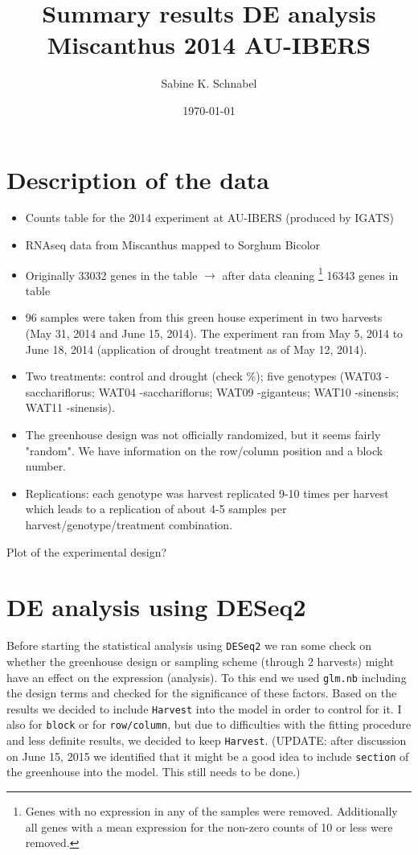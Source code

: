 \documentclass[12pt, a4paper]{article}
\title{Summary results DE analysis Miscanthus 2014 AU-IBERS}
\author{Sabine K. Schnabel}
\date{\today}
\begin{document}
\maketitle

\section*{Description of the data}
\begin{itemize}
\item Counts table for the 2014 experiment at AU-IBERS (produced by IGATS)
\item RNAseq data from Miscanthus mapped to Sorghum Bicolor
\item Originally 33032 genes in the table $\rightarrow$ after data cleaning
\footnote{Genes with no expression in any of the samples were removed. Additionally all genes with a mean expression for the non-zero counts of 10 or less were removed.} 
16343 genes in table 
\item 96 samples were taken from this green house experiment in two harvests (May 31, 2014 and June 15, 2014). The 
experiment ran from May 5, 2014 to June 18, 2014 (application of drought treatment as of May 12, 2014).
\item Two treatments: control and drought (check \%); five genotypes (WAT03 -sacchariflorus; 
WAT04 -sacchariflorus; 
WAT09 -giganteus; 
WAT10 -sinensis; 
WAT11 -sinensis).
\item The greenhouse design was not officially randomized, but it seems fairly "random". We have information on
the row/column position and a block number.
\item Replications: each genotype was harvest replicated 9-10 times per harvest which leads to a replication of about 4-5 samples per harvest/genotype/treatment combination. 
\end{itemize}
Plot of the experimental design?

\section*{DE analysis using DESeq2}
Before starting the statistical analysis using \texttt{DESeq2} we ran some check on whether the greenhouse design or 
sampling scheme (through 2 harvests) might have an effect on the expression (analysis). 
To this end we used \texttt{glm.nb} including the design terms and checked for the significance of these factors. 
Based on the results we decided to include \texttt{Harvest} into the model in order to control for it. I also 
for \texttt{block} or for \texttt{row/column}, but due to difficulties with the fitting procedure and less definite 
results, we decided to keep \texttt{Harvest}. 
\newline (UPDATE: after discussion on June 15, 2015 we identified that it 
might be a good idea to include \texttt{section} of the greenhouse into the model. This still needs to be 
done.)
\end{document}
